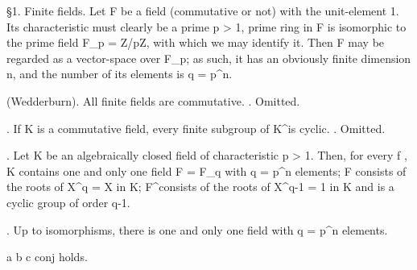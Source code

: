 
  \S 1. Finite fields. Let F be a field (commutative or not) with the
unit-element 1. Its characteristic must clearly be a prime p > 1, 
prime ring in F is isomorphic to the prime field \mathbf F_p = \mathbf Z/p\mathbf Z, with 
which we may identify it. Then F may be regarded as a vector-space over \mathbf F_p;  
as such, it has an obviously finite dimension n, and the number of its 
elements is q = p^n. 

\theorem (Wedderburn). All finite fields are commutative. 
\proof. Omitted.

\lemma. If K is a commutative field, every finite subgroup of K^\times is cyclic.
\proof. Omitted.

\theorem. Let K be an algebraically closed field of characteristic p > 1. 
Then, for every f , K contains one and only one field F = F_q with 
q = p^n elements; F consists of the roots of X^q = X in K; F^\times consists 
of the roots of X^{q-1} = 1 in K and is a cyclic group of order q-1. 

\corollary. Up to isomorphisms, there is one and only one field with q = p^n elements. 

\begin{theorem}
  a
  b
  c
  conj holds.
\end{theorem}

